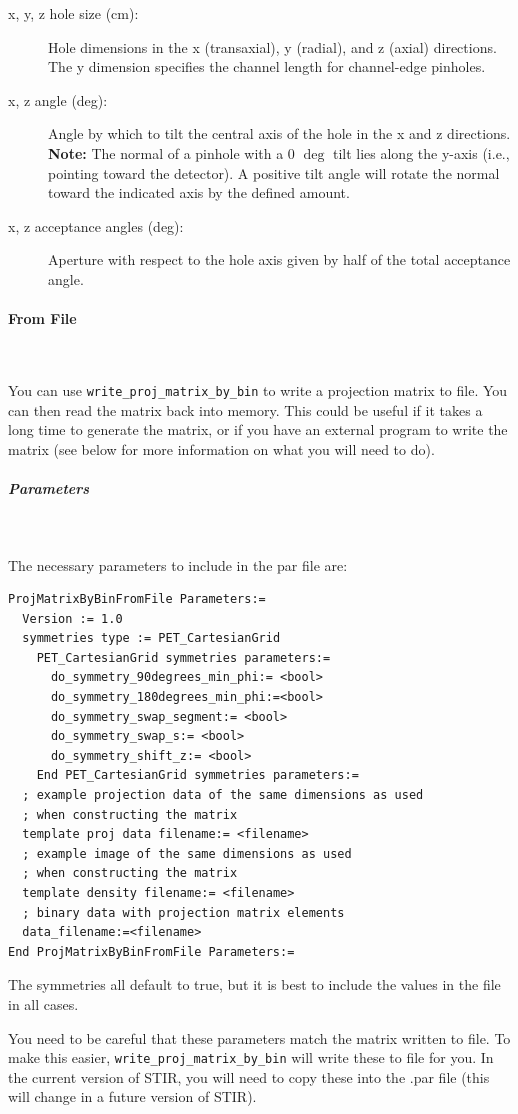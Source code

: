 \documentclass{article}
\newcommand{\subsubsubsection}[1]{\paragraph{#1}\mbox{} \\}
\newcommand{\subsubsubsubsection}[1]{\subparagraph{#1} \mbox{} \\}
\begin{document}
{{{{{{\begin{description}
\begin{description}
\item[x, y, z hole size (cm):] Hole dimensions in the x (transaxial), y (radial), and z (axial) directions. The y dimension specifies the channel length for channel-edge pinholes.

\item[x, z angle (deg):] Angle by which to tilt the central axis of the hole in the x and z directions. \textbf{Note:} The normal of a pinhole with a 0 $\mathrm{\deg}$ tilt lies along the y-axis (i.e., pointing toward the detector). A positive tilt angle will rotate the normal toward the indicated axis by the defined amount.

\item[x, z acceptance angles (deg):] Aperture with respect to the hole axis given by half of the total acceptance angle.

\end{description}
\end{description}


{ \subsubsubsection{From File} }
\label{sec:projmatrixfromfile}
You can use \texttt{write\_proj\_matrix\_by\_bin} to write a projection matrix to file. You can
then read the matrix back into memory. This
could be useful if it takes a long time to generate the matrix, or if you have an external program
to write the matrix (see below for more information on what you will need to do).


{ \subsubsubsubsection{Parameters}
}
The necessary parameters to include in the par file are:
\begin{verbatim}
ProjMatrixByBinFromFile Parameters:=
  Version := 1.0
  symmetries type := PET_CartesianGrid
    PET_CartesianGrid symmetries parameters:=
      do_symmetry_90degrees_min_phi:= <bool>
      do_symmetry_180degrees_min_phi:=<bool>
      do_symmetry_swap_segment:= <bool>
      do_symmetry_swap_s:= <bool>
      do_symmetry_shift_z:= <bool>
    End PET_CartesianGrid symmetries parameters:=
  ; example projection data of the same dimensions as used 
  ; when constructing the matrix
  template proj data filename:= <filename>
  ; example image of the same dimensions as used 
  ; when constructing the matrix
  template density filename:= <filename>
  ; binary data with projection matrix elements
  data_filename:=<filename> 
End ProjMatrixByBinFromFile Parameters:=
\end{verbatim}
The symmetries all default to true, but it is best to include the values in the file in all cases. 

You need to be careful that these parameters match the matrix written to file. To make this easier,
\texttt{write\_proj\_matrix\_by\_bin} will write these to file for you. In the current version
of STIR, you will need to copy these into the .par file (this will change in a future version of STIR).

}}}}}}
\end{document}
